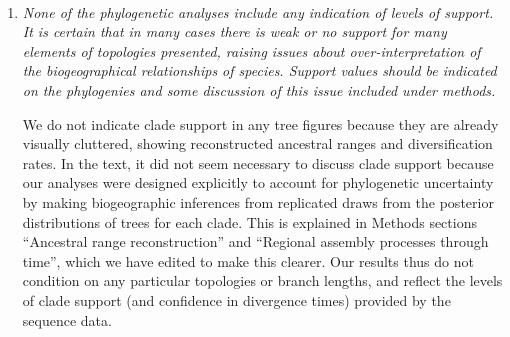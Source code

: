 \documentclass[11pt]{letter}
\begin{document}
\begin{letter}{ \\

}
\begin{enumerate}
  One difference between MEDUSA and BAMM is in their default
  assumptions about time-variable diversification: MEDUSA assumes
  time-constant regimes, while BAMM by default does not---for reasons
  not clear to us, time-invariant regimes in BAMM are considered
  ``experimental''. So we re-analyzed our Primulaceae tree with this
  option turned on in BAMM. Interestingly, this supported one increase
  in diversification---in the heterostylous clade, as found by de Vos
  et al.

  Of the clades we analyzed, shifts in diversification rate have been
  studied in only 2 others.

  \begin{enumerate}[parsep=2pt,itemsep=2pt]
  \item \textit{Rhododendron.}---Schwery et al.\ (2015) used BAMM on
    Ericaceae as a whole, sampling 61 species of \textit{Rhododendron}
    vs. our 351. They found support for one shift within
    \textit{Rhododendron} that corresponds to one of the 3--5 shifts
    in our analysis.

  \item \textit{Lilium.}---Our taxon sampling (and sequence data) was
    taken from Gao et al.\ (2013). In that study, the authors used
    LASER to estimate speciation and extinction rates in the phylogeny
    as a whole, and in selected clades, with results that are somewhat
    inconclusive and difficult to compare with ours.
  \end{enumerate}

  We have included this information (in edited form) in the SI text
  (line 202).

\item \textit{None of the phylogenetic analyses include any indication
    of levels of support. It is certain that in many cases there is
    weak or no support for many elements of topologies presented,
    raising issues about over-interpretation of the biogeographical
    relationships of species. Support values should be indicated on
    the phylogenies and some discussion of this issue included under
    methods.} \label{phylouncertainty}

  We do not indicate clade support in any tree figures because they
  are already visually cluttered, showing reconstructed ancestral
  ranges and diversification rates. In the text, it did not seem
  necessary to discuss clade support because our analyses were
  designed explicitly to account for phylogenetic uncertainty by
  making biogeographic inferences from replicated draws from the
  posterior distributions of trees for each clade. This is explained
  in Methods sections ``Ancestral range reconstruction'' and
  ``Regional assembly processes through time'', which we have edited
  to make this clearer. Our results thus do not condition on any
  particular topologies or branch lengths, and reflect the levels of
  clade support (and confidence in divergence times) provided by the
  sequence data.


\end{enumerate}
\end{letter}
\end{document}
